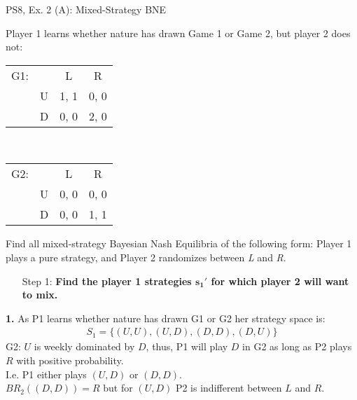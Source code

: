 \begin{frame}{PS8, Ex. 2 (A): Mixed-Strategy BNE}
    \begin{multicols}{2}
      Player 1 learns whether nature has drawn Game 1 or Game 2, but player 2 does not:
      \begin{table}
        \begin{tabular}{ll|c|c|}
          \multicolumn{1}{c}{G1:} & \multicolumn{1}{c}{} & \multicolumn{1}{c}{L} & \multicolumn{1}{c}{R} \\\cline{3-4}
          & U & 1, 1 & 0, 0 \\\cline{3-4}
          & D & 0, 0 & 2, 0 \\\cline{3-4}
        \end{tabular}\\\bigskip
        \begin{tabular}{ll|c|c|}
          \multicolumn{1}{c}{G2:} & \multicolumn{1}{c}{} & \multicolumn{1}{c}{L} & \multicolumn{1}{c}{R} \\\cline{3-4}
          & U & 0, 0 & 0, 0 \\\cline{3-4}
          & D & 0, 0 & 1, 1 \\\cline{3-4}
        \end{tabular}
      \end{table}
      Find all mixed-strategy Bayesian Nash Equilibria of the following form: Player 1 plays a pure strategy, and Player 2 randomizes between \textit{L} and \textit{R}.
      \begin{itemize}
        \item[Step 1:] \textbf{Find the player 1 strategies $\bm{s_1'}$ for which player 2 will want to mix.}
      \end{itemize}
      \vfill\null\columnbreak
      \textbf{1.} As P1 learns whether nature has drawn G1 or G2 her strategy space is:
      \begin{align*}
        S_1=\{(U,U),(U,D),(D,D),(D,U)\}
      \end{align*}
      G2: $U$ is weekly dominated by $D$, thus, P1 will play $D$ in G2 as long as P2 plays $R$ with positive probability.\\\medskip I.e. P1 either plays $(U,D)$ or $(D,D)$.\\\medskip
      $BR_2((D,D))=R$ but for $(U,D)$ P2 is indifferent between $L$ and $R$.
      \vfill\null
    \end{multicols}
\end{frame}
